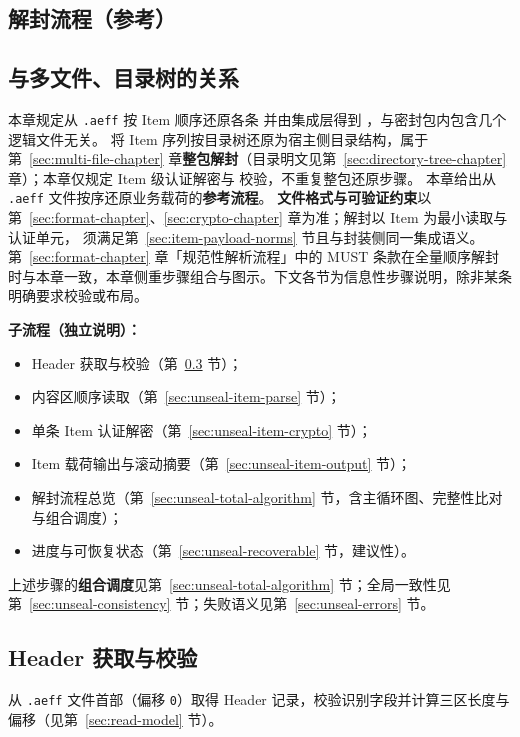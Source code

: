 \subsection{解封流程（参考）}\label{sec:unseal-chapter}

\subsection{与多文件、目录树的关系}\label{sec:unseal-byte-stream-scope}

本章规定从 \texttt{.aeff} 按 Item 顺序还原各条  并由集成层得到 ，与密封包内包含几个逻辑文件无关。
将 Item 序列按目录树还原为宿主侧目录结构，属于第~\ref{sec:multi-file-chapter} 章\textbf{整包解封}（目录明文见第~\ref{sec:directory-tree-chapter} 章）；本章仅规定 Item 级认证解密与  校验，不重复整包还原步骤。
本章给出从 \texttt{.aeff} 文件按序还原业务载荷的\textbf{参考流程}。
\textbf{文件格式与可验证约束}以第~\ref{sec:format-chapter}、\ref{sec:crypto-chapter} 章为准；解封以 Item 为最小读取与认证单元， 须满足第~\ref{sec:item-payload-norms} 节且与封装侧同一集成语义。第~\ref{sec:format-chapter} 章「规范性解析流程」中的 MUST 条款在全量顺序解封时与本章一致，本章侧重步骤组合与图示。下文各节为信息性步骤说明，除非某条明确要求校验或布局。

\textbf{子流程（独立说明）：}
\begin{itemize}
  \item Header 获取与校验（第~\ref{sec:unseal-header-model} 节）；
  \item 内容区顺序读取（第~\ref{sec:unseal-item-parse} 节）；
  \item 单条 Item 认证解密（第~\ref{sec:unseal-item-crypto} 节）；
  \item Item 载荷输出与滚动摘要（第~\ref{sec:unseal-item-output} 节）；
  \item 解封流程总览（第~\ref{sec:unseal-total-algorithm} 节，含主循环图、完整性比对与组合调度）；
  \item 进度与可恢复状态（第~\ref{sec:unseal-recoverable} 节，建议性）。
\end{itemize}
上述步骤的\textbf{组合调度}见第~\ref{sec:unseal-total-algorithm} 节；全局一致性见第~\ref{sec:unseal-consistency} 节；失败语义见第~\ref{sec:unseal-errors} 节。

\subsection{Header 获取与校验}\label{sec:unseal-header-model}
从 \texttt{.aeff} 文件首部（偏移 \texttt{0}）取得 Header 记录，校验识别字段并计算三区长度与偏移（见第~\ref{sec:read-model} 节）。

